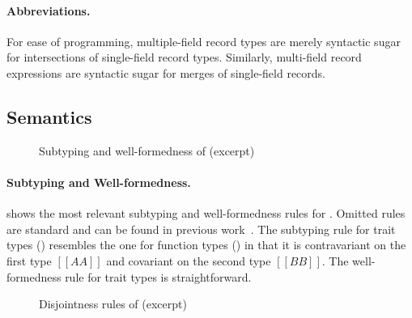 \paragraph{Abbreviations.}
For ease of programming, multiple-field record types are merely syntactic sugar
for intersections of single-field record types. Similarly, multi-field record
expressions are syntactic sugar for merges of single-field records.

\subsection{Semantics}

\begin{figure}[t]
  \centering
  \caption{Subtyping and well-formedness of \sedel (excerpt)}
  \label{fig:typesystem}
\end{figure}


\paragraph{Subtyping and Well-formedness.}
 shows the most relevant subtyping and well-formedness
rules for \sedel. Omitted rules are standard and can be found in previous
work~\cite{alpuimdisjoint}. The
subtyping rule for trait types () resembles the one for function
types () in that it is contravariant on the first type $[[AA]]$
and covariant on the second type $[[BB]]$. The well-formedness rule for trait
types is straightforward.

\begin{figure}[t]
  \centering
\begin{small}
\end{small}
\caption{Disjointness rules of \sedel (excerpt)}
  \label{fig:disjoint}
\end{figure}



